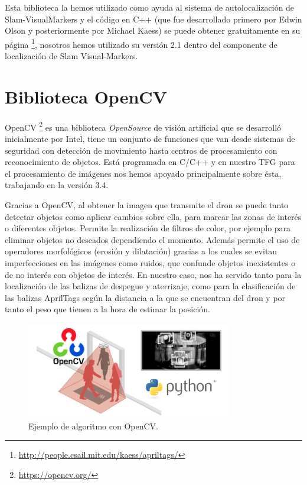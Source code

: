 \hspace{1cm} Esta biblioteca la hemos utilizado como ayuda al sistema de autolocalización de Slam-VisualMarkers y el código en C++ (que fue desarrollado primero por Edwin Olson y posteriormente por Michael Kaess) se puede obtener gratuitamente en su página \footnote{\url{http://people.csail.mit.edu/kaess/apriltags/}}, nosotros hemos utilizado su versión 2.1 dentro del componente de localización de Slam Visual-Markers.

\section{Biblioteca OpenCV}
\hspace{1cm} OpenCV \footnote{\url{https://opencv.org/}} es una biblioteca \textit{OpenSource} de visión artificial que se desarrolló inicialmente por Intel, tiene un conjunto de funciones que van desde sistemas de seguridad con detección de movimiento hasta centros de procesamiento con reconocimiento de objetos. Está programada en C/C++ y en nuestro TFG para el procesamiento de imágenes nos hemos apoyado principalmente sobre ésta, trabajando en la versión 3.4. 

\hspace{1cm} Gracias a OpenCV, al obtener la imagen que transmite el dron se puede tanto detectar objetos como aplicar cambios sobre ella, para marcar las zonas de interés o diferentes objetos. Permite la realización de filtros de color, por ejemplo para eliminar objetos no deseados dependiendo el momento. Además permite el uso de operadores morfológicos (erosión y dilatación) gracias a los cuales se evitan imperfecciones en las imágenes como ruidos, que confunde objetos inexistentes o de no interés con objetos de interés. En nuestro caso, nos ha servido tanto para la localización de las balizas de despegue y aterrizaje, como para la clasificación de las balizas AprilTags según la distancia a la que se encuentran del dron y por tanto el peso que tienen a la hora de estimar la posición.
\\

\begin{figure}[H]
	\begin{center}
		\includegraphics[width=0.8\textwidth]{imag/IMG26.png}
				\caption{Ejemplo de algoritmo con OpenCV.} 
	\label{fig:OpenCV.}	
	\end{center}
\end{figure}

